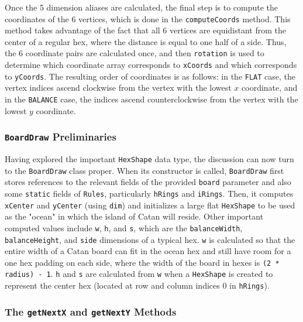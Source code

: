 \documentclass[pageno]{jpaper}
\begin{document}
\begin{doublespacing}
Once the 5 dimension aliases are calculated, the final step is to compute the coordinates of the 6 vertices, which is done in the \lstinline$computeCoords$ method. This method takes advantage of the fact that all 6 vertices are equidistant from the center of a regular hex, where the distance is equal to one half of a side. Thus, the 6 coordinate pairs are calculated once, and then \lstinline$rotation$ is used to determine which coordinate array corresponds to \lstinline$xCoords$ and which corresponds to \lstinline$yCoords$. The resulting order of coordinates is as follows: in the \lstinline$FLAT$ case, the vertex indices ascend clockwise from the vertex with the lowest $x$ coordinate, and in the \lstinline$BALANCE$ case, the indices ascend counterclockwise from the vertex with the lowest $y$ coordinate.

\hypertarget{sec:boarddraw_preliminaries}{}
\subsubsection{\lstinline$BoardDraw$ Preliminaries}

Having explored the important \lstinline$HexShape$ data type, the discussion can now turn to the \lstinline$BoardDraw$ class proper. When its constructor is called, \lstinline$BoardDraw$ first stores references to the relevant fields of the provided \lstinline$board$ parameter and also some \lstinline$static$ fields of \lstinline$Rules$, particularly \lstinline$hRings$ and \lstinline$iRings$. Then, it computes \lstinline$xCenter$ and \lstinline$yCenter$ (using \lstinline$dim$) and initializes a large flat \lstinline$HexShape$ to be used as the "ocean" in which the island of Catan will reside. Other important computed values include \lstinline$w$, \lstinline$h$, and \lstinline$s$, which are the \lstinline$balanceWidth$, \lstinline$balanceHeight$, and \lstinline$side$ dimensions of a typical hex. \lstinline$w$ is calculated so that the entire width of a Catan board can fit in the ocean hex and still have room for a one hex padding on each side, where the width of the board in hexes is \lstinline$(2 * radius) - 1$. \lstinline$h$ and \lstinline$s$ are calculated from \lstinline$w$ when a \lstinline$HexShape$ is created to represent the center hex (located at row and column indices 0 in \lstinline$hRings$). 

\hypertarget{sec:the_getnextx_and_getnexty_methods}{}
\subsubsection{The \lstinline$getNextX$ and \lstinline$getNextY$ Methods}


\end{doublespacing}
\end{document}
